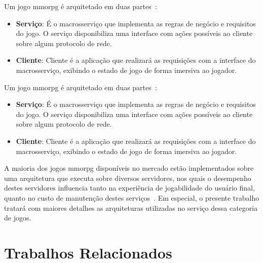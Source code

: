Um jogo \ac{mmorpg} é arquitetado em duas partes~\cite{mmo_analytic}:
\begin{itemize}
  \item \textbf{Serviço}: É o macrosserviço que implementa as regras de negócio e requisitos do jogo.
  O serviço disponibiliza uma interface com ações possíveis ao cliente sobre algum protocolo de rede.
  \item \textbf{Cliente}: Cliente é a aplicação que realizará as requisições com a interface do macrosserviço, exibindo o estado de jogo de forma imersiva ao jogador.
\end{itemize}


Um jogo \ac{mmorpg} é arquitetado em duas partes~\cite{mmo_analytic}:
\begin{itemize}
  \item \textbf{Serviço}: É o macrosserviço que implementa as regras de negócio e requisitos do jogo.
  O serviço disponibiliza uma interface com ações possíveis ao cliente sobre algum protocolo de rede.
  \item \textbf{Cliente}: Cliente é a aplicação que realizará as requisições com a interface do macrosserviço, exibindo o estado de jogo de forma imersiva ao jogador.
\end{itemize}

A maioria dos jogos \ac{mmorpg} disponíveis no mercado estão implementados sobre uma arquitetura que executa sobre diversos servidores\cite{stephenclarkewillson2017}, nos quais o desempenho destes servidores influencia tanto na experiência de jogabilidade do usuário final, quanto no custo de manutenção destes serviços~\cite{1417630}.
%
Em especial, o presente trabalho tratará com maiores detalhes as arquiteturas utilizadas no serviço dessa categoria de jogos.

\section{Trabalhos Relacionados}
\label{sec:similares}
